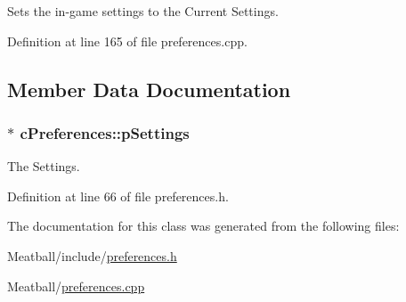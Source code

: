Sets the in-\/game settings to the Current Settings. 



Definition at line 165 of file preferences.\-cpp.



\subsection{Member Data Documentation}
\hypertarget{classc_preferences_a75e0bc75d9ed4414ccae7b8933686af4}{
\subsubsection[{p\-Settings}]{$\ast$ c\-Preferences\-::p\-Settings}}\label{classc_preferences_a75e0bc75d9ed4414ccae7b8933686af4}


The Settings. 



Definition at line 66 of file preferences.\-h.



The documentation for this class was generated from the following files\-:\begin{DoxyCompactItemize}
\item 
Meatball/include/\hyperlink{preferences_8h}{preferences.\-h}\item 
Meatball/\hyperlink{preferences_8cpp}{preferences.\-cpp}\end{DoxyCompactItemize}
